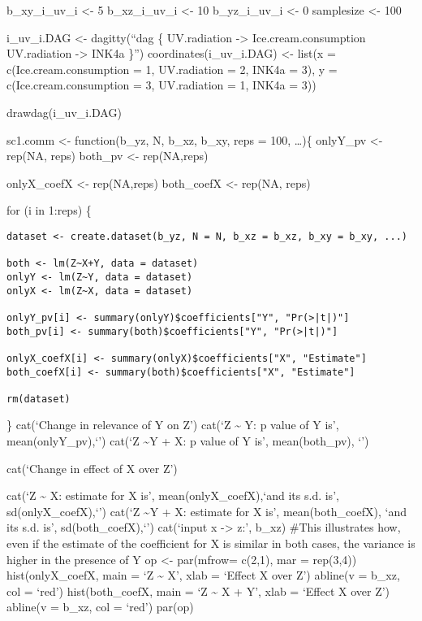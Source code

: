 \documentclass[
]{article}
\begin{document}
b\_xy\_i\_uv\_i \textless- 5 b\_xz\_i\_uv\_i \textless- 10
b\_yz\_i\_uv\_i \textless- 0 samplesize \textless- 100

i\_uv\_i.DAG \textless- dagitty(``dag \{ UV.radiation -\textgreater{}
Ice.cream.consumption UV.radiation -\textgreater{} INK4a \}'')
coordinates(i\_uv\_i.DAG) \textless- list(x = c(Ice.cream.consumption =
1, UV.radiation = 2, INK4a = 3), y = c(Ice.cream.consumption = 3,
UV.radiation = 1, INK4a = 3))

drawdag(i\_uv\_i.DAG)

sc1.comm \textless- function(b\_yz, N, b\_xz, b\_xy, reps = 100,
\ldots)\{ onlyY\_pv \textless- rep(NA, reps) both\_pv \textless-
rep(NA,reps)

onlyX\_coefX \textless- rep(NA,reps) both\_coefX \textless- rep(NA,
reps)

for (i in 1:reps) \{

\begin{verbatim}
dataset <- create.dataset(b_yz, N = N, b_xz = b_xz, b_xy = b_xy, ...)

both <- lm(Z~X+Y, data = dataset)
onlyY <- lm(Z~Y, data = dataset)
onlyX <- lm(Z~X, data = dataset)

onlyY_pv[i] <- summary(onlyY)$coefficients["Y", "Pr(>|t|)"]
both_pv[i] <- summary(both)$coefficients["Y", "Pr(>|t|)"]

onlyX_coefX[i] <- summary(onlyX)$coefficients["X", "Estimate"]
both_coefX[i] <- summary(both)$coefficients["X", "Estimate"]

rm(dataset)
\end{verbatim}

\} cat(`\n Change in relevance of Y on Z\n') cat(`\nWhen Z
\textasciitilde{} Y: \nThe p value of Y is', mean(onlyY\_pv),`\n')
cat(`\nWhen Z \textasciitilde Y + X: \nThe p value of Y is',
mean(both\_pv), `\n')

cat(`\n Change in effect of X over Z')

cat(`\nWhen Z \textasciitilde{} X: \nThe estimate for X is',
mean(onlyX\_coefX),`and its s.d. is', sd(onlyX\_coefX),`\n')
cat(`\nWhen Z \textasciitilde Y + X: \nThe estimate for X is',
mean(both\_coefX), `and its s.d. is', sd(both\_coefX),`\n')
cat(`\nBeing input x -\textgreater{} z:', b\_xz) \#This illustrates how,
even if the estimate of the coefficient for X is similar in both cases,
the variance is higher in the presence of Y op \textless- par(mfrow=
c(2,1), mar = rep(3,4)) hist(onlyX\_coefX, main = `Z \textasciitilde{}
X', xlab = `Effect X over Z') abline(v = b\_xz, col = `red')
hist(both\_coefX, main = `Z \textasciitilde{} X + Y', xlab = `Effect X
over Z') abline(v = b\_xz, col = `red') par(op)
\end{document}
